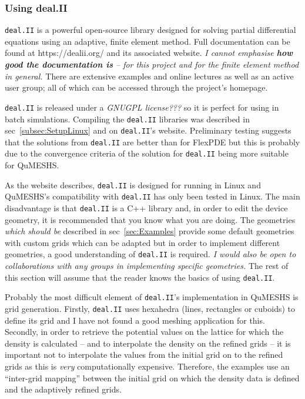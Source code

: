 \documentclass[12pt]{article}
\newcommand{\red}[1]{{\color{red} \it #1}}
\begin{document}
{\subsubsection{Using deal.II}
\label{subsubsec:UsingdealII}

\texttt{deal.II} is a powerful open-source library designed for solving partial differential
equations using an adaptive, finite element method.  Full documentation can be found at
https://dealii.org/ and its associated website.  \emph{I cannot emphasise {\bf how good the
documentation is} -- for this project and for the finite element method in general.}  There are
extensive examples and online lectures as well as an active user group; all of which can
be accessed through the project's homepage.

\texttt{deal.II} is released under a \red{GNUGPL license???} so it is perfect for using in
batch simulations.  Compiling the \texttt{deal.II} libraries was described in
sec~\ref{subsec:SetupLinux} and on \texttt{deal.II}'s website.  Preliminary testing
suggests that the solutions from \texttt{deal.II} are better than for FlexPDE but this
is probably due to the convergence criteria of the solution for \texttt{deal.II} being
more suitable for QuMESHS.

As the website describes, \texttt{deal.II} is designed for running in Linux and QuMESHS's
compatibility with \texttt{deal.II} has only been tested in Linux.  The main disadvantage is
that \texttt{deal.II} is a C++ library and, in order to edit the device geometry, it is
recommended that you know what you are doing.  The geometries \red{which should be} described
in sec~\ref{sec:Examples} provide some default geometries with custom grids which can be
adapted but in order to implement different geometries, a good understanding of
\texttt{deal.II} is required.  \red{I would also be open to collaborations with any groups
in implementing specific geometries.}  The rest of this section will assume that the
reader knows the basics of using \texttt{deal.II}.

Probably the most difficult element of \texttt{deal.II}'s implementation in QuMESHS is
grid generation.  Firstly, \texttt{deal.II} uses hexahedra (lines, rectangles or cuboids)
to define its grid and I have not found a good meshing application for this.  Secondly,
in order to retrieve the potential values on the lattice for which the density is calculated
-- and to interpolate the density on the refined grids -- it is important not to
interpolate the values from the initial grid on to the refined grids as this is
\emph{\color{red} very} computationally expensive.  Therefore, the examples use an
``inter-grid mapping'' between the initial grid on which the density data is defined
and the adaptively refined grids.

}
\end{document}
